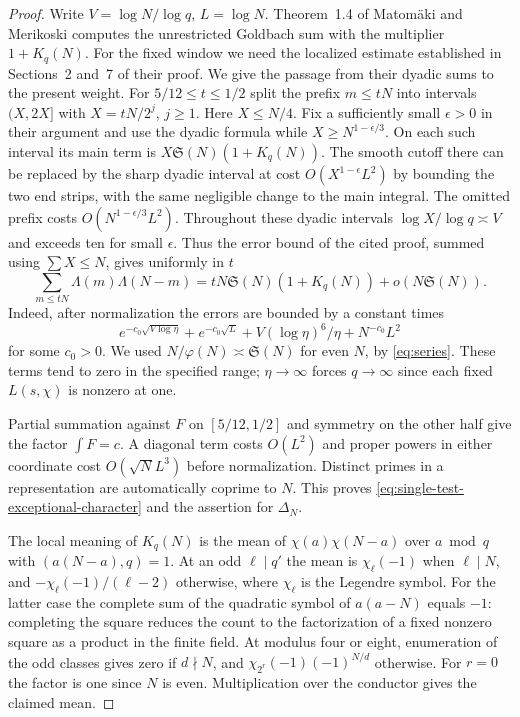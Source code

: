 \documentclass[11pt,a4paper]{article}
\numberwithin{equation}{section}
\newcommand{\SSS}{\mathfrak S}
\begin{document}
\begin{proof}
Write $V=\log N/\log q$, $L=\log N$. Theorem~1.4 of
Matom\"aki and Merikoski \cite{MatomakiMerikoskiSiegel} computes
the unrestricted Goldbach sum with the multiplier $1+K_q(N)$.
For the fixed window we need the localized estimate established in
Sections~2 and~7 of their proof. We give the passage from their
dyadic sums to the present weight. For $5/12\le t\le1/2$ split
the prefix $m\le tN$ into intervals $(X,2X]$ with
$X=tN/2^j$, $j\ge1$. Here $X\le N/4$. Fix a sufficiently small
$\epsilon>0$ in their argument and use the dyadic formula while
$X\ge N^{1-\epsilon/3}$. On each such interval its main term
is $X\SSS(N)(1+K_q(N))$. The smooth cutoff there can be replaced
by the sharp dyadic interval at cost $O(X^{1-\epsilon}L^2)$
by bounding the two end strips, with the same negligible change
to the main integral. The omitted prefix costs
$O(N^{1-\epsilon/3}L^2)$. Throughout these dyadic intervals
$\log X/\log q\asymp V$ and exceeds ten for small $\epsilon$.
Thus the error bound of the cited proof, summed using
$\sum X\le N$, gives uniformly in $t$
\[
 \sum_{m\le tN}\Lambda(m)\Lambda(N-m)
     =tN\SSS(N)(1+K_q(N))+o(N\SSS(N)).
\]
Indeed, after normalization the errors are bounded by a constant
times
\[
 e^{-c_0\sqrt{V\log\eta}}+e^{-c_0\sqrt L}
       +V(\log\eta)^6/\eta+N^{-c_0}L^2
\]
for some $c_0>0$. We used $N/\varphi(N)\asymp\SSS(N)$ for even
$N$, by \eqref{eq:series}. These terms tend to zero in the
specified range; $\eta\to\infty$ forces $q\to\infty$ since
each fixed $L(s,\chi)$ is nonzero at one.

Partial summation against $F$ on $[5/12,1/2]$ and symmetry on
the other half give the factor $\int F=c$. A diagonal term costs
$O(L^2)$ and proper powers in either coordinate cost
$O(\sqrt N L^3)$ before normalization. Distinct primes in a
representation are automatically coprime to $N$. This proves
\eqref{eq:single-test-exceptional-character} and the assertion
for $\Delta_N$.

The local meaning of $K_q(N)$ is the mean of
$\chi(a)\chi(N-a)$ over $a\bmod q$ with $(a(N-a),q)=1$.
At an odd $\ell\mid q'$ the mean is $\chi_\ell(-1)$ when
$\ell\mid N$, and $-\chi_\ell(-1)/(\ell-2)$ otherwise, where
$\chi_\ell$ is the Legendre symbol. For the latter case the
complete sum of the quadratic symbol of $a(a-N)$ equals $-1$:
completing the square reduces the count to the factorization of
a fixed nonzero square as a product in the finite field.
At modulus four or eight, enumeration of the odd classes gives
zero if $d\nmid N$, and $\chi_{2^r}(-1)(-1)^{N/d}$ otherwise.
For $r=0$ the factor is one since $N$ is even. Multiplication
over the conductor gives the claimed mean.


\end{proof}
\end{document}
